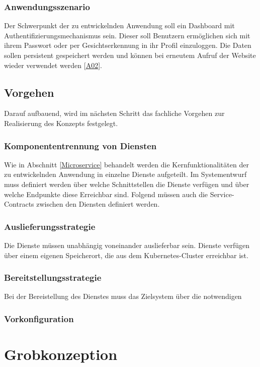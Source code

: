 \subsubsection{Anwendungsszenario}\label{Anwendungsszenario}

Der Schwerpunkt der zu entwickelnden Anwendung soll ein Dashboard mit Authentifizierungsmechanismus sein. 
Dieser soll Benutzern ermöglichen sich mit ihrem Passwort oder per Gesichtserkennung in ihr Profil einzuloggen. 
Die Daten sollen persistent gespeichert werden und können bei erneutem Aufruf der Website wieder verwendet werden [\hyperlink{A02}{A02}]. 

\subsection{Vorgehen}
Darauf aufbauend, wird im nächsten Schritt das fachliche Vorgehen zur Realisierung des Konzepts festgelegt.

\subsubsection{Komponententrennung von Diensten}
Wie in Abschnitt \ref{Microservice} behandelt werden die Kernfunktionalitäten der zu entwickelnden Anwendung  in einzelne Dienste aufgeteilt.
Im Systementwurf muss definiert werden über welche Schnittstellen die Dienste verfügen und über welche Endpunkte diese Erreichbar sind.
Folgend müssen auch die Service-Contracts zwischen den Diensten definiert werden.

\subsubsection{Auslieferungsstrategie}
Die Dienste müssen unabhängig voneinander auslieferbar sein.
Dienste verfügen über einem eigenen Speicherort, die aus dem Kubernetes-Cluster erreichbar ist.

\subsubsection{Bereitstellungsstrategie}
Bei der Bereistellung des Dienstes muss das Zielsystem über die notwendigen 

\subsubsection{Vorkonfiguration}


\section{Grobkonzeption}

